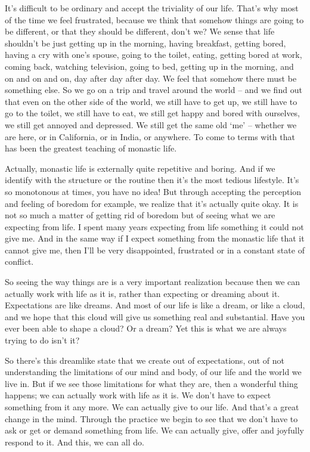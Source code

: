 It's difficult to be ordinary and accept the triviality of our life. That's why most of the time we feel frustrated, because we think that somehow things are going to be different, or that they should be different, don't we? We sense that life shouldn't be just getting up in the morning, having breakfast, getting bored, having a cry with one's spouse, going to the toilet, eating, getting bored at work, coming back, watching television, going to bed, getting up in the morning, and on and on and on, day after day after day. We feel that somehow there must be something else. So we go on a trip and travel around the world -- and we find out that even on the other side of the world, we still have to get up, we still have to go to the toilet, we still have to eat, we still get happy and bored with ourselves, we still get annoyed and depressed. We still get the same old `me' -- whether we are here, or in California, or in India, or anywhere. To come to terms with that has been the greatest teaching of monastic life.

Actually, monastic life is externally quite repetitive and boring. And if we identify with the structure or the routine then it's the most tedious lifestyle. It's so monotonous at times, you have no idea! But through accepting the perception and feeling of boredom for example, we realize that it's actually quite okay. It is not so much a matter of getting rid of boredom but of seeing what we are expecting from life. I spent many years expecting from life something it could not give me.  And in the same way if I expect something from the monastic life that it cannot give me, then I'll be very disappointed, frustrated or in a constant state of conflict.

So seeing the way things are is a very important realization because then we can actually work with life as it is, rather than expecting or dreaming about it. Expectations are like dreams. And most of our life is like a dream, or like a cloud, and we hope that this cloud will give us something real and substantial. Have you ever been able to shape a cloud? Or a dream? Yet this is what we are always trying to do isn't it? 

So there's this dreamlike state that we create out of expectations, out of not understanding the limitations of our mind and body, of our life and the world we live in. But if we see those limitations for what they are, then a wonderful thing happens; we can actually work with life as it is. We don't have to expect something from it any more. We can actually give to our life. And that's a great change in the mind. Through the practice we begin to see that we don't have to ask or get or demand something from life. We can actually give, offer and joyfully respond to it. And this, we can all do.

